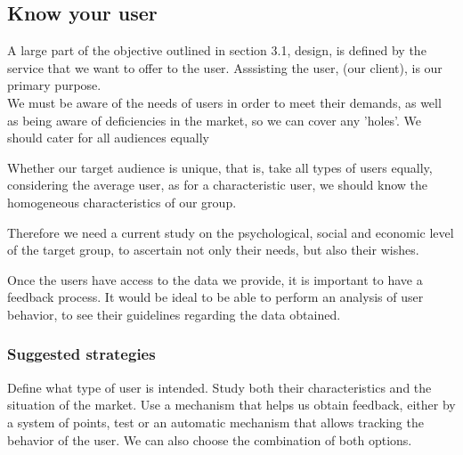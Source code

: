 \subsection{Know your user}
A large part of the objective outlined in section 3.1, design, is defined by the service that we want to offer
to the user. Asssisting the user, (our client), is our primary purpose. \\


We must be aware of the needs of users in order to meet their demands, as well as being aware of deficiencies in the market, so we can cover any 'holes'.
We should cater for all audiences equally 

Whether our target audience is unique, that is, take all types of users equally, considering the
average user, as for a characteristic user, we should know the homogeneous characteristics of our group.

Therefore we need a current study on the psychological, social and economic level of the target group, to ascertain not only
their needs, but also their wishes.

Once the users have access to the data we provide, it is important to have a feedback process.
It would be ideal to be able to perform an analysis of user behavior, to see their guidelines regarding the data obtained.
\subsubsection*{Suggested strategies} 
Define what type of user is intended. Study both their characteristics and the situation of the
market.
Use a mechanism that helps us obtain feedback, either by a system of points, test or
an automatic mechanism that allows tracking the behavior of the user. We can also choose the combination of both
options.

